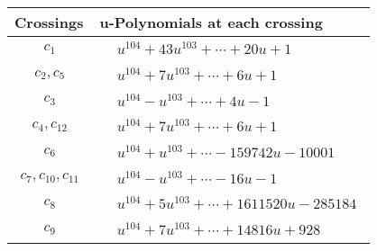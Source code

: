 \documentclass[1p]{elsarticle_modified}
\theoremstyle{definition}
\begin{document}
\begin{tabular}{m{50pt}|m{274pt}}
Crossings & \hspace{64pt}u-Polynomials at each crossing \\
\hline $$\begin{aligned}c_{1}\end{aligned}$$&$\begin{aligned}
&u^{104}+43 u^{103}+\cdots+20 u+1
\end{aligned}$\\
\hline $$\begin{aligned}c_{2},c_{5}\end{aligned}$$&$\begin{aligned}
&u^{104}+7 u^{103}+\cdots+6 u+1
\end{aligned}$\\
\hline $$\begin{aligned}c_{3}\end{aligned}$$&$\begin{aligned}
&u^{104}- u^{103}+\cdots+4 u-1
\end{aligned}$\\
\hline $$\begin{aligned}c_{4},c_{12}\end{aligned}$$&$\begin{aligned}
&u^{104}+7 u^{103}+\cdots+6 u+1
\end{aligned}$\\
\hline $$\begin{aligned}c_{6}\end{aligned}$$&$\begin{aligned}
&u^{104}+u^{103}+\cdots-159742 u-10001
\end{aligned}$\\
\hline $$\begin{aligned}c_{7},c_{10},c_{11}\end{aligned}$$&$\begin{aligned}
&u^{104}- u^{103}+\cdots-16 u-1
\end{aligned}$\\
\hline $$\begin{aligned}c_{8}\end{aligned}$$&$\begin{aligned}
&u^{104}+5 u^{103}+\cdots+1611520 u-285184
\end{aligned}$\\
\hline $$\begin{aligned}c_{9}\end{aligned}$$&$\begin{aligned}
&u^{104}+7 u^{103}+\cdots+14816 u+928
\end{aligned}$\\
\hline
\end{tabular}\newpage\renewcommand{\arraystretch}{1}
\end{document}
